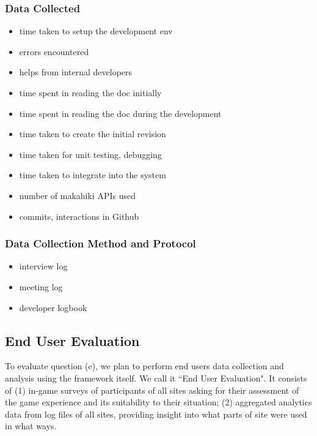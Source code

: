 \documentclass[11pt,final]{article}
\begin{document}
\subsubsection{Data Collected}
\begin{itemize}
 \item time taken to setup the development env
 \item errors encountered
 \item helps from internal developers
 \item time spent in reading the doc initially
 \item time spent in reading the doc during the development
 \item time taken to create the initial revision
 \item time taken for unit testing, debugging
 \item time taken to integrate into the system
 \item number of makahiki APIs used
 \item commits, interactions in Github
\end{itemize}

\subsubsection{Data Collection Method and Protocol}
\begin{itemize}
\item interview log
\item meeting log
\item developer logbook
\end{itemize}

\subsection{End User Evaluation}
To evaluate question (c), we plan to perform end users data collection and analysis using the framework itself. We call it ``End User Evaluation". It consists of (1) in-game surveys of participants of all sites asking for their assessment of the game experience and its suitability to their situation;
(2) aggregated analytics data from log files of all sites, providing insight into what parts of site were used in what ways.
\end{document}
